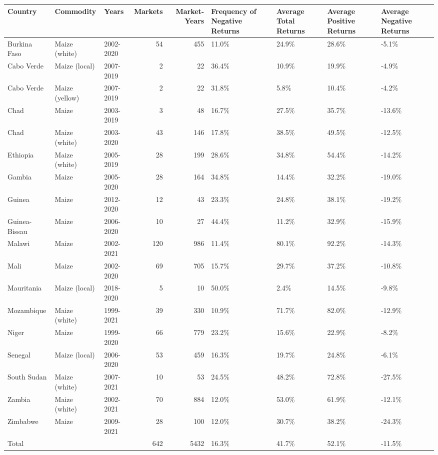 \begin{table}[ht]
\centering
\begin{tabular}{lllrrllll}
  \hline
Country & Commodity & Years & Markets & Market-Years & Frequency of Negative Returns & Average Total Returns & Average Positive Returns & Average Negative Returns \\ 
  \hline
Burkina Faso & Maize (white) & 2002-2020 &  54 & 455 & 11.0\% & 24.9\% & 28.6\% & -5.1\% \\ 
  Cabo Verde & Maize (local) & 2007-2019 &   2 &  22 & 36.4\% & 10.9\% & 19.9\% & -4.9\% \\ 
  Cabo Verde & Maize (yellow) & 2007-2019 &   2 &  22 & 31.8\% & 5.8\% & 10.4\% & -4.2\% \\ 
  Chad & Maize & 2003-2019 &   3 &  48 & 16.7\% & 27.5\% & 35.7\% & -13.6\% \\ 
  Chad & Maize (white) & 2003-2020 &  43 & 146 & 17.8\% & 38.5\% & 49.5\% & -12.5\% \\ 
  Ethiopia & Maize (white) & 2005-2019 &  28 & 199 & 28.6\% & 34.8\% & 54.4\% & -14.2\% \\ 
  Gambia & Maize & 2005-2020 &  28 & 164 & 34.8\% & 14.4\% & 32.2\% & -19.0\% \\ 
  Guinea & Maize & 2012-2020 &  12 &  43 & 23.3\% & 24.8\% & 38.1\% & -19.2\% \\ 
  Guinea-Bissau & Maize & 2006-2020 &  10 &  27 & 44.4\% & 11.2\% & 32.9\% & -15.9\% \\ 
  Malawi & Maize & 2002-2021 & 120 & 986 & 11.4\% & 80.1\% & 92.2\% & -14.3\% \\ 
  Mali & Maize & 2002-2020 &  69 & 705 & 15.7\% & 29.7\% & 37.2\% & -10.8\% \\ 
  Mauritania & Maize (local) & 2018-2020 &   5 &  10 & 50.0\% & 2.4\% & 14.5\% & -9.8\% \\ 
  Mozambique & Maize (white) & 1999-2021 &  39 & 330 & 10.9\% & 71.7\% & 82.0\% & -12.9\% \\ 
  Niger & Maize & 1999-2020 &  66 & 779 & 23.2\% & 15.6\% & 22.9\% & -8.2\% \\ 
  Senegal & Maize (local) & 2006-2020 &  53 & 459 & 16.3\% & 19.7\% & 24.8\% & -6.1\% \\ 
  South Sudan & Maize (white) & 2007-2021 &  10 &  53 & 24.5\% & 48.2\% & 72.8\% & -27.5\% \\ 
  Zambia & Maize (white) & 2002-2021 &  70 & 884 & 12.0\% & 53.0\% & 61.9\% & -12.1\% \\ 
  Zimbabwe & Maize & 2009-2021 &  28 & 100 & 12.0\% & 30.7\% & 38.2\% & -24.3\% \\ 
  Total &  &  & 642 & 5432 & 16.3\% & 41.7\% & 52.1\% & -11.5\% \\ 
   \hline
\end{tabular}
\end{table}
